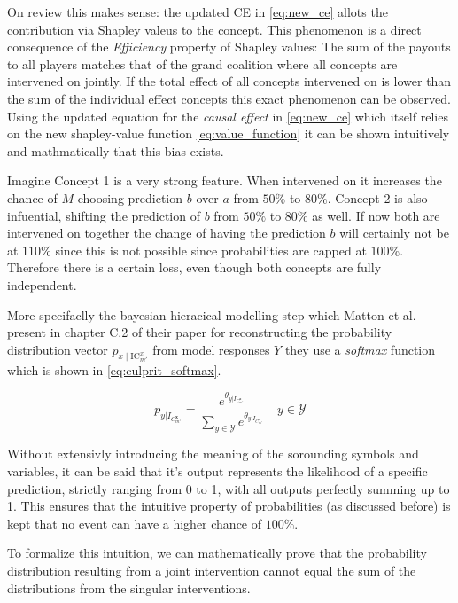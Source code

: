 On review this makes sense: the updated CE in \ref{eq:new_ce} allots the contribution via Shapley valeus to the concept. This phenomenon is a direct consequence of the \emph{Efficiency} property of Shapley values: The sum of the payouts to all players matches that of the grand coalition where all concepts are intervened on jointly. If the total effect of all concepts intervened on is lower than the sum of the individual effect concepts this exact phenomenon can be observed. Using the updated equation for the \emph{causal effect} in \ref{eq:new_ce} which itself relies on the new shapley-value function \ref{eq:value_function} it can be shown intuitively and mathmatically that this bias exists.

Imagine Concept 1 is a very strong feature. When intervened on it increases the chance of $M$ choosing prediction $b$ over $a$ from $50\%$ to $80\%$. Concept 2 is also infuential, shifting the prediction of $b$ from $50\%$ to $80\%$ as well. If now both are intervened on together the change of having the prediction $b$ will certainly not be at $110\%$ since this is not possible since probabilities are capped at $100\%$. Therefore there is a certain loss, even though both concepts are fully independent. 

More specifaclly the bayesian hieracical modelling step which Matton et al. present in chapter C.2 of their paper for reconstructing the probability distribution vector $p_{x \mid \text{IC}_{m'}^{x}}$ from model responses $Y$ they use a \emph{softmax} function which is shown in \ref{eq:culprit_softmax}.

\begin{equation}
\label{eq:culprit_softmax}
p_{y|I_{C_{m'}^{\mathbf{x}}}} = \frac{e^{\theta_{y|I_{C_{m'}^{\mathbf{x}}}}}}{\sum_{y \in \mathcal{Y}} e^{\theta_{y|I_{C_{m'}^{\mathbf{x}}}}}} \quad y \in \mathcal{Y}
\end{equation}

Without extensivly introducing the meaning of the sorounding symbols and variables, it can be said that it's output represents the likelihood of a specific prediction, strictly ranging from 0 to 1, with all outputs perfectly summing up to 1. This ensures that the intuitive property of probabilities (as discussed before) is kept that no event can have a higher chance of $100\%$.

To formalize this intuition, we can mathematically prove that the probability distribution resulting from a joint intervention cannot equal the sum of the distributions from the singular interventions.

